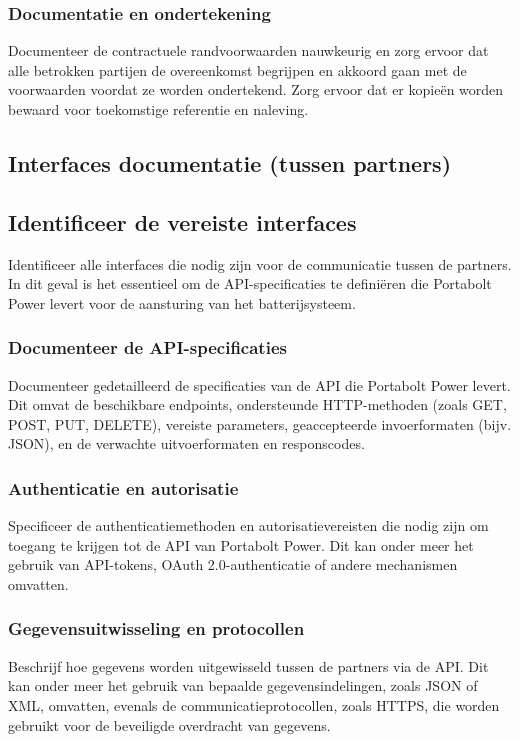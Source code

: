 \subsubsection{Documentatie en ondertekening}
Documenteer de contractuele randvoorwaarden nauwkeurig en zorg ervoor dat alle betrokken partijen de overeenkomst begrijpen en akkoord gaan met de voorwaarden voordat ze worden ondertekend. Zorg ervoor dat er kopieën worden bewaard voor toekomstige referentie en naleving.

\subsection{Interfaces documentatie (tussen partners)}

\subsection{Identificeer de vereiste interfaces}
Identificeer alle interfaces die nodig zijn voor de communicatie tussen de partners. In dit geval is het essentieel om de API-specificaties te definiëren die Portabolt Power levert voor de aansturing van het batterijsysteem.

\subsubsection{Documenteer de API-specificaties}
Documenteer gedetailleerd de specificaties van de API die Portabolt Power levert. Dit omvat de beschikbare endpoints, ondersteunde HTTP-methoden (zoals GET, POST, PUT, DELETE), vereiste parameters, geaccepteerde invoerformaten (bijv. JSON), en de verwachte uitvoerformaten en responscodes.

\subsubsection{Authenticatie en autorisatie}
Specificeer de authenticatiemethoden en autorisatievereisten die nodig zijn om toegang te krijgen tot de API van Portabolt Power. Dit kan onder meer het gebruik van API-tokens, OAuth 2.0-authenticatie of andere mechanismen omvatten.

\subsubsection{Gegevensuitwisseling en protocollen}
Beschrijf hoe gegevens worden uitgewisseld tussen de partners via de API. Dit kan onder meer het gebruik van bepaalde gegevensindelingen, zoals JSON of XML, omvatten, evenals de communicatieprotocollen, zoals HTTPS, die worden gebruikt voor de beveiligde overdracht van gegevens.

